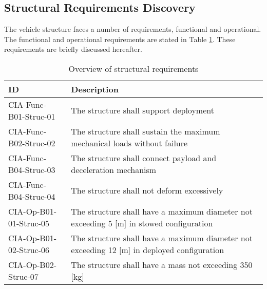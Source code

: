 \subsection{Structural Requirements Discovery} \label{sec:struct}
The vehicle structure faces a number of requirements, functional and operational. The functional and operational requirements are stated in Table \ref{tab:strucfuncrequirements}. These requirements are briefly discussed hereafter.
\begin{table}[H]
	\caption{Overview of structural requirements}	 
	\begin{tabular}{|p{}|p{}|}
    \hline
    ID          & Description                                                                                                      \\ \hline \hline
    CIA-Func-B01-Struc-01 & The structure shall support deployment \\ \hline
    CIA-Func-B02-Struc-02 & The structure shall sustain the maximum mechanical loads without failure                           \\ \hline
    CIA-Func-B04-Struc-03 & The structure shall connect payload and deceleration mechanism \\ \hline
    CIA-Func-B04-Struc-04 & The structure shall not deform excessively \\ \hline
    CIA-Op-B01-01-Struc-05 & The structure shall have a maximum diameter not exceeding 5 [m] in stowed configuration                              \\ \hline
    CIA-Op-B01-02-Struc-06 & The structure shall have a maximum diameter not exceeding 12 [m] in deployed configuration     \\ \hline
    CIA-Op-B02-Struc-07 & The structure shall have a mass not exceeding 350 [kg]\\ \hline
    \end{tabular}
\label{tab:strucfuncrequirements}
\end{table}
